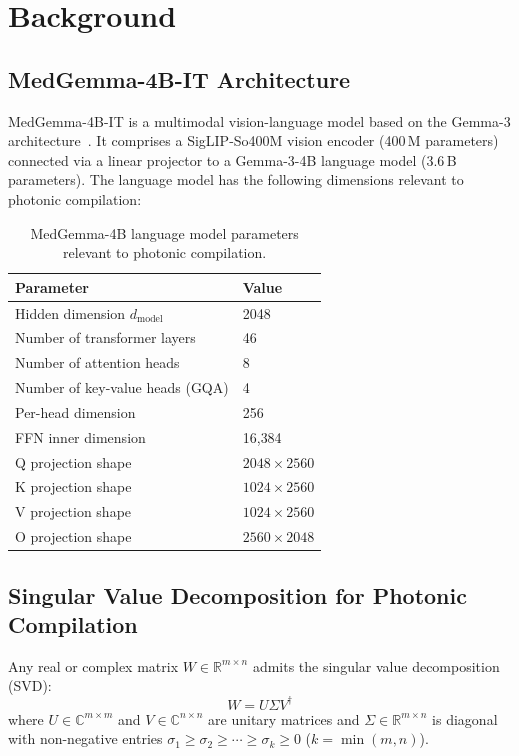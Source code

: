 \documentclass[12pt, a4paper]{article}
\begin{document}
\section{Background}
\label{sec:background}

\subsection{MedGemma-4B-IT Architecture}

MedGemma-4B-IT is a multimodal vision-language model based on the Gemma-3
architecture~\cite{gemma3_2024}.
It comprises a SigLIP-So400M vision encoder (400\,M parameters) connected via
a linear projector to a Gemma-3-4B language model (3.6\,B parameters).
The language model has the following dimensions relevant to photonic compilation:

\begin{table}[h]
\centering
\caption{MedGemma-4B language model parameters relevant to photonic compilation.}
\label{tab:medgemma_arch}
\begin{tabular}{ll}
\toprule
\textbf{Parameter} & \textbf{Value} \\
\midrule
Hidden dimension $d_{\text{model}}$ & 2048 \\
Number of transformer layers & 46 \\
Number of attention heads & 8 \\
Number of key-value heads (GQA) & 4 \\
Per-head dimension & 256 \\
FFN inner dimension & 16{,}384 \\
\midrule
Q projection shape & $2048 \times 2560$ \\
K projection shape & $1024 \times 2560$ \\
V projection shape & $1024 \times 2560$ \\
O projection shape & $2560 \times 2048$ \\
\bottomrule
\end{tabular}
\end{table}

\subsection{Singular Value Decomposition for Photonic Compilation}

Any real or complex matrix $W \in \mathbb{R}^{m \times n}$ admits the singular
value decomposition (SVD):
\begin{equation}
  W = U \Sigma V^\dagger
  \label{eq:svd}
\end{equation}
where $U \in \mathbb{C}^{m \times m}$ and $V \in \mathbb{C}^{n \times n}$ are
unitary matrices and $\Sigma \in \mathbb{R}^{m \times n}$ is diagonal with
non-negative entries $\sigma_1 \geq \sigma_2 \geq \cdots \geq \sigma_k \geq 0$
($k = \min(m, n)$).
\end{document}

